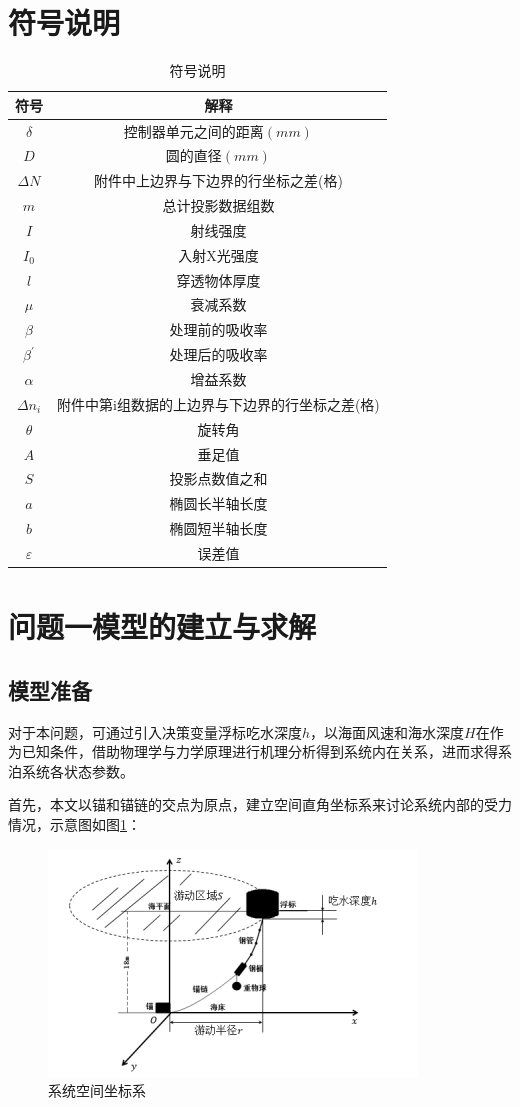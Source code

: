 \documentclass{article}
\numberwithin{equation}{subsection}
\begin{document}
\section{符号说明}
\begin{table}[H]
    \centering
    \begin{tabular}{c|c}
\hline
符号&解释\\
\hline
$\delta$&控制器单元之间的距离$(mm)$\\
$D$&圆的直径$(mm)$\\
$\Delta N$&附件中上边界与下边界的行坐标之差(格)\\
$m$&总计投影数据组数\\
$I$&射线强度\\
$I_0$&入射X光强度\\
$l$&穿透物体厚度\\
$\mu$&衰减系数\\
$\beta$&处理前的吸收率\\
$\beta^{'}$&处理后的吸收率\\
$\alpha$&增益系数\\			
$\Delta n_i$&附件中第i组数据的上边界与下边界的行坐标之差(格)\\
$\theta$&旋转角\\
$A$&垂足值\\
$S$&投影点数值之和\\
$a$&椭圆长半轴长度\\
$b$&椭圆短半轴长度\\
$\varepsilon$&误差值\\
\hline
    \end{tabular}
    \caption{符号说明}
    \label{tab:my_label}
\end{table}


\section{问题一模型的建立与求解}
\subsection{模型准备}
对于本问题，可通过引入决策变量浮标吃水深度$h$，以海面风速和海水深度$H$在作为已知条件，借助物理学与力学原理进行机理分析得到系统内在关系，进而求得系泊系统各状态参数。

首先，本文以锚和锚链的交点为原点，建立空间直角坐标系来讨论系统内部的受力情况，示意图如图\ref{坐标系}：
\begin{figure}[H]
  \centering
  \includegraphics[scale=0.6]{1.png}
  \caption{\kaishu 系统空间坐标系}
  \label{坐标系}
\end{figure}
\end{document}
